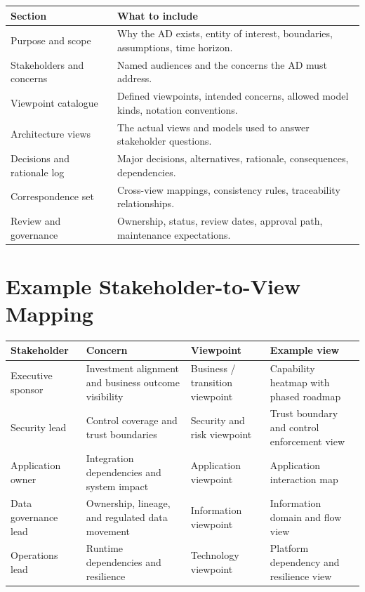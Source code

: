 \documentclass[11pt]{article}
\begin{document}
\begin{center}
\renewcommand{\arraystretch}{1.2}
\begin{tabularx}{\textwidth}{>{\raggedright\arraybackslash}p{} X}
\toprule
\textbf{Section} & \textbf{What to include} \\
\midrule
Purpose and scope & Why the AD exists, entity of interest, boundaries, assumptions, time horizon. \\
Stakeholders and concerns & Named audiences and the concerns the AD must address. \\
Viewpoint catalogue & Defined viewpoints, intended concerns, allowed model kinds, notation conventions. \\
Architecture views & The actual views and models used to answer stakeholder questions. \\
Decisions and rationale log & Major decisions, alternatives, rationale, consequences, dependencies. \\
Correspondence set & Cross-view mappings, consistency rules, traceability relationships. \\
Review and governance & Ownership, status, review dates, approval path, maintenance expectations. \\
\bottomrule
\end{tabularx}
\end{center}

\section*{Example Stakeholder-to-View Mapping}
\begin{center}
\renewcommand{\arraystretch}{1.2}
\begin{tabularx}{\textwidth}{>{\raggedright\arraybackslash}p{} >{\raggedright\arraybackslash}p{} >{\raggedright\arraybackslash}p{} >{\raggedright\arraybackslash}X}
\toprule
\textbf{Stakeholder} & \textbf{Concern} & \textbf{Viewpoint} & \textbf{Example view} \\
\midrule
Executive sponsor & Investment alignment and business outcome visibility & Business / transition viewpoint & Capability heatmap with phased roadmap \\
Security lead & Control coverage and trust boundaries & Security and risk viewpoint & Trust boundary and control enforcement view \\
Application owner & Integration dependencies and system impact & Application viewpoint & Application interaction map \\
Data governance lead & Ownership, lineage, and regulated data movement & Information viewpoint & Information domain and flow view \\
Operations lead & Runtime dependencies and resilience & Technology viewpoint & Platform dependency and resilience view \\
\bottomrule
\end{tabularx}
\end{center}
\end{document}
